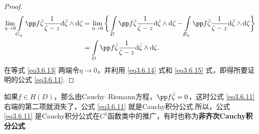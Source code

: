 \begin{proof}
\begin{equation}
\begin{aligned}
\lim_{\eta\to0}\int\limits_{G_\eta}\pp f{\bar\zeta}\frac1{\zeta-z}\textrm d\bar\zeta\wedge\textrm d\zeta&=\lim_{\eta\to0}\bigg\{
\int\limits_{D}\pp f{\bar\zeta}\frac1{\zeta-z}\textrm d\bar\zeta\wedge\textrm d\zeta-\int\limits_{B_\eta}\pp f{\bar\zeta}\frac1{\zeta-z}\textrm d\bar\zeta\wedge\textrm d\zeta\bigg\}\\
&=\int\limits_D\pp f{\bar\zeta}\frac1{\zeta-z}\textrm d\bar\zeta\wedge\textrm d\zeta.
\end{aligned}
\end{equation}
在等式 \eqref{eq3.6.13} 两端令$\eta\to0$，并利用 \eqref{eq3.6.14} 式和 \eqref{eq3.6.15} 式，即得所要证明的公式 \eqref{eq3.6.11}.
\end{proof}

如果$f\in H(D)$，那么由Cauchy--Riemann方程，$\pp f{\bar \zeta}=0$，这时公式 \eqref{eq3.6.11} 右端的第二项就消失了，公式 \eqref{eq3.6.11} 就是Cauchy积分公式.所以，公式 \eqref{eq3.6.11} 是Cauchy积分公式在$C^1$函数类中的推广，有时也称为\textbf{非齐次Cauchy积分公式}.

